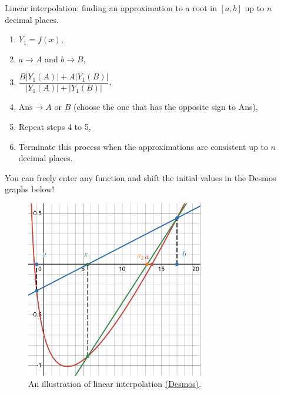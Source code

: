 \documentclass[../Notes.tex]{subfiles}
\begin{document}
\begin{GCSkills}{}
    Linear interpolation: finding an approximation to a root in \([a,b]\) up to \(n\) decimal places.
    \begin{enumerate}
        \item \(Y_1=f(x)\),
        \item \(a \to A\) and \(b \to B\),
        \item \(\dfrac{B \lvert Y_1(A) \rvert+A \lvert Y_1(B) \rvert}{\lvert Y_1(A) \rvert+\lvert Y_1(B) \rvert}\),
        \item \(\text{Ans}\to A \text{ or } B\) (choose the one that has the opposite sign to Ans),
        \item Repeat steps 4 to 5,
        \item Terminate this process when the approximations are consistent up to \(n\) decimal places.
    \end{enumerate}
    \end{GCSkills}
    You can freely enter any function and shift the initial values in the Desmos graphs below!
    \newpage
    \begin{figure}[H]
        \centering
        \includegraphics[width=0.69\textwidth]{../Diagrams/linear-interpolation.pdf}
        \caption{An illustration of linear interpolation \href{https://www.desmos.com/calculator/yz71wfvkrl}{(Desmos)}.}
        \label{fig:linear-interpolation}
    \end{figure}
\end{document}
